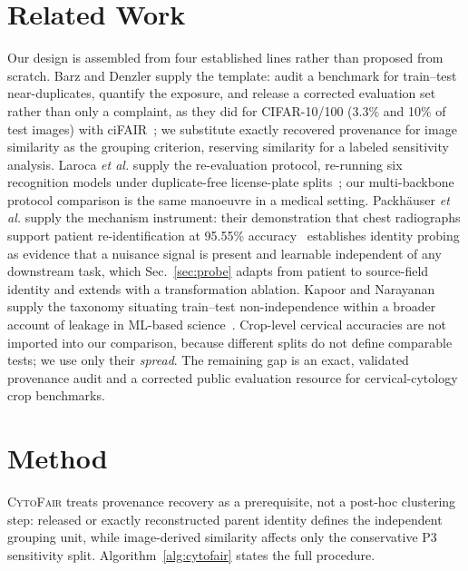 \documentclass[conference]{IEEEtran}
\newcommand{\protocol}[1]{\textsf{#1}}
\newcommand{\cytofair}{\textsc{CytoFair}}
\begin{document}
\section{Related Work}
Our design is assembled from four established lines rather than proposed from scratch.
Barz and Denzler supply the template: audit a benchmark for train--test near-duplicates, quantify the exposure, and release a corrected evaluation set rather than only a complaint, as they did for CIFAR-10/100 (3.3\% and 10\% of test images) with ciFAIR~\cite{barz2020cifair}; we substitute exactly recovered provenance for image similarity as the grouping criterion, reserving similarity for a labeled sensitivity analysis.
Laroca \emph{et al.} supply the re-evaluation protocol, re-running six recognition models under duplicate-free license-plate splits~\cite{laroca2023lpr}; our multi-backbone protocol comparison is the same manoeuvre in a medical setting.
Packh\"auser \emph{et al.} supply the mechanism instrument: their demonstration that chest radiographs support patient re-identification at 95.55\% accuracy~\cite{packhauser2022reidentification} establishes identity probing as evidence that a nuisance signal is present and learnable independent of any downstream task, which Sec.~\ref{sec:probe} adapts from patient to source-field identity and extends with a transformation ablation.
Kapoor and Narayanan supply the taxonomy situating train--test non-independence within a broader account of leakage in ML-based science~\cite{kapoor2023leakage}.
Crop-level cervical accuracies are not imported into our comparison, because different splits do not define comparable tests; we use only their \emph{spread}.
The remaining gap is an exact, validated provenance audit and a corrected public evaluation resource for cervical-cytology crop benchmarks.

\section{Method}
\cytofair{} treats provenance recovery as a prerequisite, not a post-hoc clustering step: released or exactly reconstructed parent identity defines the independent grouping unit, while image-derived similarity affects only the conservative \protocol{P3} sensitivity split.
Algorithm~\ref{alg:cytofair} states the full procedure.
\end{document}
